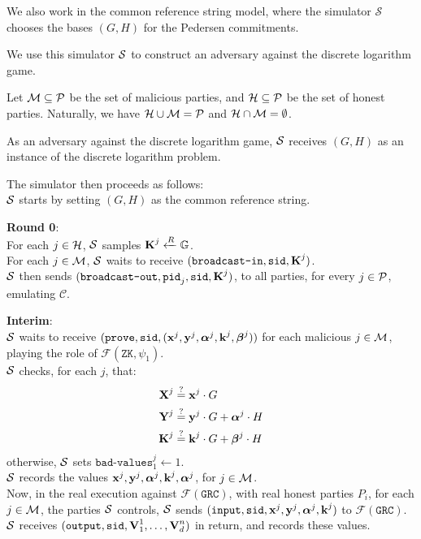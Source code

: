 We also work in the common reference string model, where the simulator
$\mathcal{S}$ chooses the bases $(G, H)$ for the Pedersen commitments.

We use this simulator $\mathcal{S}$ to construct an adversary against
the discrete logarithm game.

Let $\mathcal{M} \subseteq \mathcal{P}$ be the set of malicious parties,
and $\mathcal{H} \subseteq \mathcal{P}$ be the set of honest parties. Naturally,
we have $\mathcal{H} \cup \mathcal{M} = \mathcal{P}$ and $\mathcal{H} \cap \mathcal{M} = \emptyset$.

As an adversary against the discrete logarithm game,
$\mathcal{S}$ receives $(G, H)$ as an instance 
of the discrete logarithm problem.

The simulator then proceeds as follows:\\
$\mathcal{S}$ starts by setting $(G, H)$ as the common reference string.

\textbf{Round 0}:\\
For each $j \in \mathcal{H}$, $\mathcal{S}$ samples $\textbf{K}^j \xleftarrow{R} \mathbb{G}$.\\
For each $j \in \mathcal{M}$,
$\mathcal{S}$ waits to receive $(\texttt{broadcast-in}, \texttt{sid}, \textbf{K}^j)$.\\
$\mathcal{S}$ then sends $(\texttt{broadcast-out}, \texttt{pid}_j, \texttt{sid}, \textbf{K}^j)$,
to all parties, for every $j \in \mathcal{P}$, emulating $\mathcal{C}$.

\textbf{Interim}:\\
$\mathcal{S}$ waits to receive $(\texttt{prove}, \texttt{sid}, (\textbf{x}^j, \textbf{y}^j, \boldsymbol{\alpha}^j, \textbf{k}^j, \boldsymbol{\beta}^j))$
for each malicious ${j \in \mathcal{M}}$,
playing the role of $\mathcal{F}(\texttt{ZK}, \psi_1)$.\\
$\mathcal{S}$ checks, for each $j$, that:
$$
\begin{aligned}
\textbf{X}^j &\stackrel{?}{=} \textbf{x}^j \cdot G\\
\textbf{Y}^j &\stackrel{?}{=} \textbf{y}^j \cdot G + \boldsymbol{\alpha}^j \cdot H\\
\textbf{K}^j &\stackrel{?}{=} \textbf{k}^j \cdot G + \boldsymbol{\beta}^j \cdot H
\end{aligned}
$$
otherwise, $\mathcal{S}$ sets $\texttt{bad-values}^j_1 \gets 1$.\\
$\mathcal{S}$ records the values $\textbf{x}^j, \textbf{y}^j, \boldsymbol{\alpha}^j, \textbf{k}^j, \boldsymbol{\alpha}^j$, for $j \in \mathcal{M}$.\\

Now, in the real execution against $\mathcal{F}(\texttt{GRC})$,
with real honest parties $P_i$, for
each $j \in \mathcal{M}$, the parties $\mathcal{S}$ controls, $\mathcal{S}$ sends
$(\texttt{input}, \texttt{sid}, \textbf{x}^j, \textbf{y}^j, \boldsymbol{\alpha}^j, \textbf{k}^j)$ to $\mathcal{F}(\texttt{GRC})$.\\
$\mathcal{S}$ receives $(\texttt{output}, \texttt{sid}, \textbf{V}^1_1, \ldots, \textbf{V}^n_d)$ in return,
and records these values.

